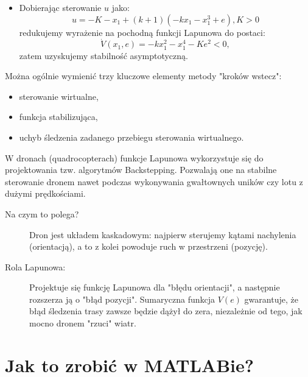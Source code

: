 \documentclass{article}
\begin{document}
\begin{tcolorbox}[colback=green!5, colframe=green!75!black, title=Przykład]
\begin{itemize}
        $$
            V(x_{1}, e) = V_{1}(x_{1}) + \frac{1}{2}e^{2} = \frac{1}{2}x_{1}^2 + \frac{1}{2}e^{2}.
        $$
        Jej pochodna wynosi:
        $$
        \dot{V}(x_{1}, e) = \dot{V}_{1}(x_{1}) + e\dot{e} = -kx_{1}^2 - x_{1}^{4}+e \left[ u + x_{1} + (k+1)(-kx_{1} - x_{1}^{3} + e) \right]
        $$
        \item Dobierając sterowanie $u$ jako:
        $$
            u = -K - x_{1} + (k+1)(-kx_{1} - x_{1}^{3} + e), K>0
        $$
        redukujemy wyrażenie na pochodną funkcji Lapunowa do postaci:
        $$
            \dot{V}(x_{1}, e) = - kx_{1}^{2} - x_{1}^{4} - Ke^{2} < 0,
        $$
        zatem uzyskujemy stabilność asymptotyczną.
    \end{itemize}
    \end{tcolorbox}
    Można ogólnie wymienić trzy kluczowe elementy metody "kroków wstecz":
    \begin{itemize}
        \item sterowanie wirtualne,
        \item funkcja stabilizująca,
        \item uchyb śledzenia zadanego przebiegu sterowania wirtualnego.
    \end{itemize}

    \begin{tcolorbox}[colback=magenta!5, colframe=magenta!75!black, title=Zastosowanie w robotyce]
        W dronach (quadrocopterach) funkcje Lapunowa wykorzystuje się do projektowania tzw. algorytmów Backstepping. Pozwalają one na stabilne sterowanie dronem nawet podczas wykonywania gwałtownych uników czy lotu z dużymi prędkościami.
        \begin{description}
            \item [Na czym to polega?] Dron jest układem kaskadowym: najpierw sterujemy kątami nachylenia (orientacją), a to z kolei powoduje ruch w przestrzeni (pozycję).
            \item[Rola Lapunowa:] Projektuje się funkcję Lapunowa dla "błędu orientacji", a następnie rozszerza ją o "błąd pozycji". Sumaryczna funkcja $V(e)$ gwarantuje, że błąd śledzenia trasy zawsze będzie dążył do zera, niezależnie od tego, jak mocno dronem "rzuci" wiatr.
        \end{description}
    \end{tcolorbox}
    
\section{Jak to zrobić w MATLABie?}
\end{document}

